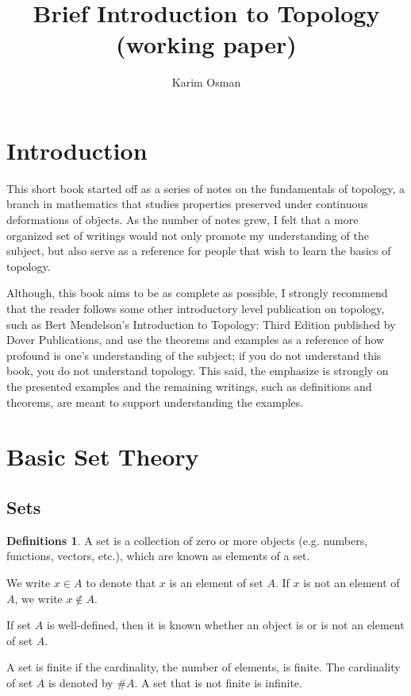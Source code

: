 \documentclass[12pt,a4paper]{article}
\theoremstyle{definition}
\newtheorem{defns}[defn]{Definitions}
\begin{document}
\author{Karim Osman}
\title{Brief Introduction to Topology \\ (working paper)}
\maketitle
\tableofcontents
\section{Introduction}
This short book started off as a series of notes on the fundamentals of
topology, a branch in mathematics that studies properties preserved under
continuous deformations of objects. As the number of notes grew, I felt that a
more organized set of writings would not only promote my understanding of the
subject, but also serve as a reference for people that wish to learn the basics
of topology.

Although, this book aims to be as complete as possible, I strongly recommend
that the reader follows some other introductory level publication on topology,
such as Bert Mendelson's Introduction to Topology: Third Edition published by
Dover Publications, and use the theorems and examples as a reference of how
profound is one's understanding of the subject; if you do not understand this
book, you do not understand topology. This said, the emphasize is strongly on
the presented examples and the remaining writings, such as definitions and
theorems, are meant to support understanding the examples.
\section{Basic Set Theory}
\subsection{Sets}
\begin{defns}
A set is a collection of zero or more objects (e.g. numbers, functions,
vectors, etc.), which are known as elements of a set.

We write $x \in A$ to denote that $x$ is an element of set $A$. If $x$ is not
an element of $A$, we write $x \notin A$.

If set $A$ is well-defined, then it is known whether an object is or is not an
element of set $A$.

A set is finite if the cardinality, the number of elements, is finite. The
cardinality of set $A$ is denoted by $\#A$. A set that is not finite is
infinite.
\end{defns}
\end{document}
